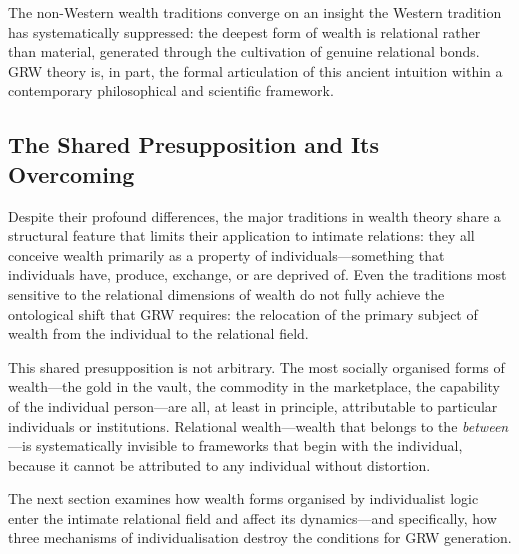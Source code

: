 \begin{claim}
The non-Western wealth traditions converge on an insight the Western tradition has systematically suppressed: the deepest form of wealth is relational rather than material, generated through the cultivation of genuine relational bonds. GRW theory is, in part, the formal articulation of this ancient intuition within a contemporary philosophical and scientific framework.
\end{claim}

\subsection{The Shared Presupposition and Its Overcoming}
\label{p15:subsec:sharedpresupposition}

\noindent
Despite their profound differences, the major traditions in wealth theory share a structural feature that limits their application to intimate relations: they all conceive wealth primarily as a property of individuals---something that individuals have, produce, exchange, or are deprived of. Even the traditions most sensitive to the relational dimensions of wealth do not fully achieve the ontological shift that GRW requires: the relocation of the primary subject of wealth from the individual to the relational field.

This shared presupposition is not arbitrary. The most socially organised forms of wealth---the gold in the vault, the commodity in the marketplace, the capability of the individual person---are all, at least in principle, attributable to particular individuals or institutions. Relational wealth---wealth that belongs to the \emph{between}---is systematically invisible to frameworks that begin with the individual, because it cannot be attributed to any individual without distortion.

The next section examines how wealth forms organised by individualist logic enter the intimate relational field and affect its dynamics---and specifically, how three mechanisms of individualisation destroy the conditions for GRW generation.
